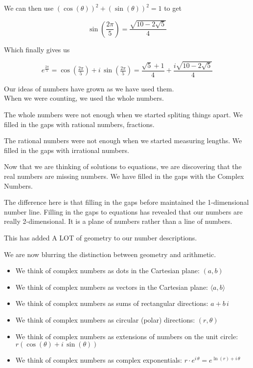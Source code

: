 \documentclass{ximera}
\begin{document}
\begin{claim}
We can then use $(\cos(\theta))^2 +  (\sin(\theta))^2 = 1$ to get 


\[   \sin\left(\frac{2\pi}{5}\right)  =  \frac{\sqrt{10 - 2 \sqrt{5}}}{4}  \]




Which finally gives us



\[   e^{\tfrac{2\pi}{5}} = \cos(\tfrac{2\pi}{5}) + i \, \sin(\tfrac{2\pi}{5}) =  \frac{\sqrt{5} + 1}{4} +   \frac{i \sqrt{10 - 2 \sqrt{5}}}{4}     \]

\end{claim}







Our ideas of numbers have grown as we have used them. \\

When we were counting, we used the whole numbers.

The whole numbers were not enough when we started spliting things apart.  We filled in the gaps with rational numbers, fractions.

The rational numbers were not enough when we started measuring lengths. We filled in the gaps with irrational numbers.

Now that we are thinking of solutions to equations, we are discovering that the real numbers are missing numbers.  We have filled in the gaps with the Complex Numbers.

The difference here is that filling in the gaps before maintained the 1-dimensional number line.  Filling in the gaps to equations has revealed that our numbers are really 2-dimensional.  It is a plane of numbers rather than a line of numbers.

This has added A LOT of geometry to our number descriptions.

We are now blurring the distinction between geometry and arithmetic.

\begin{itemize}
\item We think of complex numbers as dots in the Cartesian plane:  $(a, b)$
\item We think of complex numbers as vectors in the Cartesian plane:  $\langle a, b \rangle$
\item We think of complex numbers as sums of rectangular directions:  $a + b \, i$
\item We think of complex numbers as circular (polar) directions:  $(r, \theta)$
\item We think of complex numbers as extensions of numbers on the unit circle:  $r(\cos(\theta)+i \, \sin(\theta))$
\item We think of complex numbers as complex exponentials:  $r\cdot e^{i\, \theta} = e^{\ln(r)+i\, \theta}$
\end{itemize}
\end{document}
